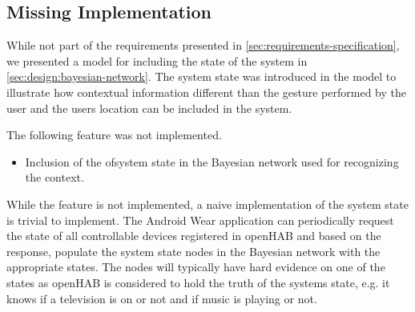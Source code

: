 \subsection{Missing Implementation}

While not part of the requirements presented in \cref{sec:requirements-specification}, we presented a model for including the state of the system in \cref{sec:design:bayesian-network}. The system state was introduced in the model to illustrate how contextual information different than the gesture performed by the user and the users location can be included in the system.

The following feature was not implemented.

\begin{itemize}
\item Inclusion of the ofsystem state in the Bayesian network used for recognizing the context.
\end{itemize}

While the feature is not implemented, a naive implementation of the system state is trivial to implement. The Android Wear application can periodically request the state of all controllable devices registered in openHAB and based on the response, populate the system state nodes in the Bayesian network with the appropriate states. The nodes will typically have hard evidence on one of the states as openHAB is considered to hold the truth of the systems state, e.g. it knows if a television is on or not and if music is playing or not.

